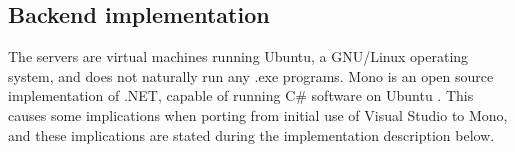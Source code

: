 \subsection{Backend implementation}\label{subsec:backend_impl}
The servers are virtual machines running Ubuntu, a GNU/Linux operating system, and does not naturally run any .exe programs. Mono is an open source implementation of .NET, capable of running C\# software on Ubuntu \citep{mono}. This causes some implications when porting from initial use of Visual Studio to Mono, and these implications are stated during the implementation description below. 


